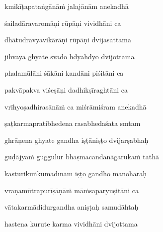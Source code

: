 kmikīṭapataṅgānā\.m jalajānām anekadhā \veg\dontdisplaylinenum

śailadāravaromāṇi rūpāṇi vividhāni ca\thinspace{\dandab} \dontdisplaylinenum

dhātudravyavikārāṇi rūpāṇi dvijasattama \veg\dontdisplaylinenum



jihvayā ghyate svādo hdyāhdyo dvijottama\thinspace{\dandab} \dontdisplaylinenum

phalamūlāni śākāni kandāni piśitāni ca \veg\dontdisplaylinenum

pakvāpakva viśeṣāṇi dadhikṣīraghtāni ca\thinspace{\dandab} \dontdisplaylinenum

vrīhyoṣadhirasānā\.m ca miśrāmiśram anekadhā \veg\dontdisplaylinenum

ṣaṭkarmapratibhedena rasabhedaśata smtam\thinspace{\dandab} \dontdisplaylinenum



ghrāṇena ghyate gandha iṣṭāniṣṭo dvijarṣabhaḥ \veg\dontdisplaylinenum

guḍājya\.m guggulur bhaṣmacandanāgaruka\.m tathā\thinspace{\dandab} \dontdisplaylinenum

kastūrikuṅkumādīnām iṣṭo gandho manoharaḥ \veg\dontdisplaylinenum

vraṇamūtrapurīṣāṇā\.m mā\.msaparyuṣitāni ca\thinspace{\dandab} \dontdisplaylinenum

vātakarmādidurgandha aniṣṭaḥ samudāhtaḥ \veg\dontdisplaylinenum



hastena kurute karma vividhāni dvijottama\thinspace{\dandab} \dontdisplaylinenum

